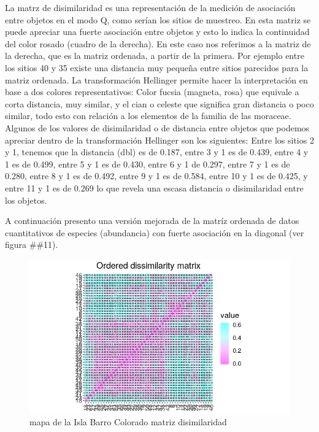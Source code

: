 \documentclass[11pt,]{article}
\begin{document}
La matrz de disimilaridad es una representación de la medición de
asociación entre objetos en el modo Q, como serían los sitios de
muestreo. En esta matriz se puede apreciar una fuerte asociación entre
objetos y esto lo indica la continuidad del color rosado (cuadro de la
derecha). En este caso nos referimos a la matriz de la derecha, que es
la matriz ordenada, a partir de la primera. Por ejemplo entre los sitios
40 y 35 existe una distancia muy pequeña entre sitios parecidos para la
matriz ordenada. La transformación Hellinger permite hacer la
interpretación en base a dos colores representativos: Color fucsia
(magneta, rosa) que equivale a corta distancia, muy similar, y el cian o
celeste que significa gran distancia o poco similar, todo esto con
relación a los elementos de la familia de las moraceae. Algunos de los
valores de disimilaridad o de distancia entre objetos que podemos
apreciar dentro de la transformación Hellinger son los siguientes: Entre
los sitios 2 y 1, tenemos que la distancia (dbl) es de 0.187, entre 3 y
1 es de 0.439, entre 4 y 1 es de 0.499, entre 5 y 1 es de 0.430, entre 6
y 1 de 0.297, entre 7 y 1 es de 0.280, entre 8 y 1 es de 0.492, entre 9
y 1 es de 0.584, entre 10 y 1 es de 0.425, y entre 11 y 1 es de 0.269 lo
que revela una escasa distancia o disimilaridad entre los objetos.

A continuación presento una versión mejorada de la matríz ordenada de
datos cuantitativos de especies (abundancia) con fuerte asociación en la
diagonal (ver figura \#\#11).

\begin{figure}
\centering
\includegraphics[width=1.00000\textwidth]{matrizdedisimilaridad.png}
\caption{mapa de la Isla Barro Colorado matriz disimilaridad
\label{fig:bci_map}}
\end{figure}
\end{document}
